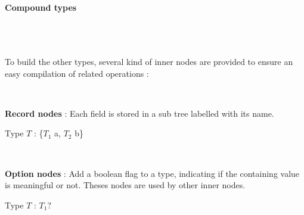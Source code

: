 \documentclass[10pt,a4paper]{article}
\renewcommand{\indent}{~\\\vspace{-.8cm}}
\begin{document}
\paragraph{Compound types}~\\\indent


To build the other types, several kind of inner nodes are provided to ensure an easy compilation of related operations :

\newlength{\pict}
\setlength{\pict}{.22\textwidth}

\begin{itemize}
	\item[] 
	\begin{minipage}[b]{.95\textwidth}
		\begin{figure}
		\end{figure}
		~%
		\item \textbf{Record nodes} : Each field is stored in a sub tree labelled with its name.
		\begin{flushright}
			Type $T$ : {\{$T_1$ a, $T_2$ b\}}
		\end{flushright}
	\end{minipage} 
	
	\item[] 
	\begin{minipage}[b]{.95\textwidth}
		\begin{figure}
		\end{figure}
		~%
		\item \textbf{Option nodes} : Add a boolean flag to a type, indicating if the containing value is meaningful or not. Theses nodes are used by other inner nodes.
		\begin{flushright}
			Type $T$ : $T_1?$
		\end{flushright}
	\end{minipage} 
	

\end{itemize}
\end{document}

